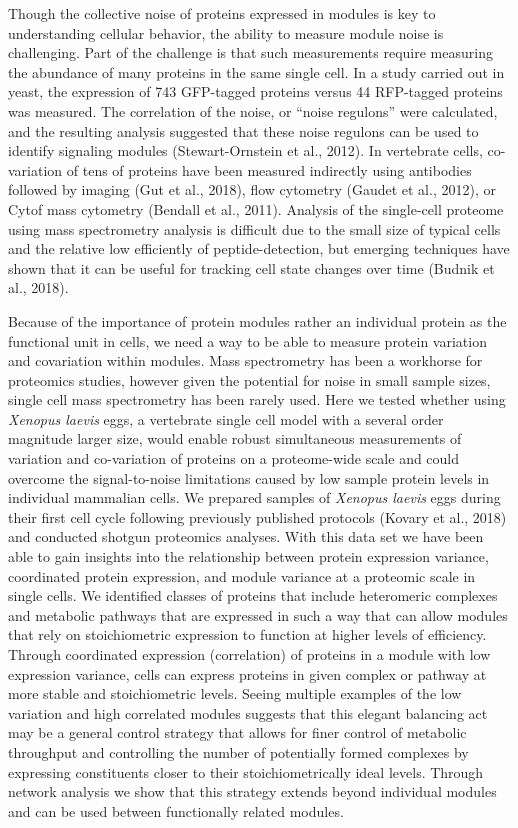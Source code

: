 Though the collective noise of proteins expressed in modules is key to understanding cellular behavior, the ability to measure module noise is challenging. Part of the challenge is that such measurements require measuring the abundance of many proteins in the same single cell. In a study carried out in yeast, the expression of 743 GFP-tagged proteins versus 44 RFP-tagged proteins was measured. The correlation of the noise, or “noise regulons” were calculated, and the resulting analysis suggested that these noise regulons can be used to identify signaling modules (Stewart-Ornstein et al., 2012). In vertebrate cells, co-variation of tens of proteins have been measured indirectly using antibodies followed by imaging (Gut et al., 2018), flow cytometry (Gaudet et al., 2012), or Cytof mass cytometry (Bendall et al., 2011). Analysis of the single-cell proteome using mass spectrometry analysis is difficult due to the small size of typical cells and the relative low efficiently of peptide-detection, but emerging techniques have shown that it can be useful for tracking cell state changes over time (Budnik et al., 2018).  

Because of the importance of protein modules rather an individual protein as the functional unit in cells, we need a way to be able to measure protein variation and covariation within modules. Mass spectrometry has been a workhorse for proteomics studies, however given the potential for noise in small sample sizes, single cell mass spectrometry has been rarely used. Here we tested whether using \emph{Xenopus laevis} eggs, a vertebrate single cell model with a several order magnitude larger size, would enable robust simultaneous measurements of variation and co-variation of proteins on a proteome-wide scale and could overcome the signal-to-noise limitations caused by low sample protein levels in individual mammalian cells. We prepared samples of \emph{Xenopus laevis} eggs during their first cell cycle following previously published protocols (Kovary et al., 2018) and conducted shotgun proteomics analyses. With this data set we have been able to gain insights into the relationship between protein expression variance, coordinated protein expression, and module variance at a proteomic scale in single cells. We identified classes of proteins that include heteromeric complexes and metabolic pathways that are expressed in such a way that can allow modules that rely on stoichiometric expression to function at higher levels of efficiency. Through coordinated expression (correlation) of proteins in a module with low expression variance, cells can express proteins in given complex or pathway at more stable and stoichiometric levels. Seeing multiple examples of the low variation and high correlated modules suggests that this elegant balancing act may be a general control strategy that allows for finer control of metabolic throughput and controlling the number of potentially formed complexes by expressing constituents closer to their stoichiometrically ideal levels. Through network analysis we show that this strategy extends beyond individual modules and can be used between functionally related modules.

